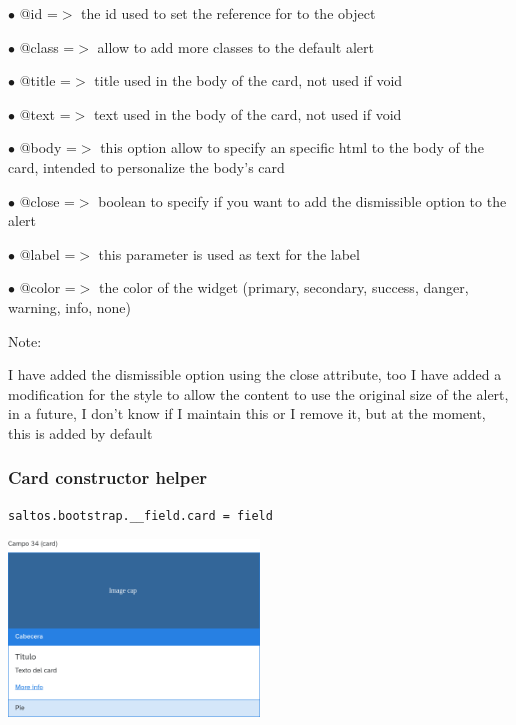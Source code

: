 \documentclass[a4paper]{article}
\begin{document}
\begin{compactitem}
\item[\color{myblue}$\bullet$] @id    =$>$ the id used to set the reference for to the object
\item[\color{myblue}$\bullet$] @class =$>$ allow to add more classes to the default alert
\item[\color{myblue}$\bullet$] @title =$>$ title used in the body of the card, not used if void
\item[\color{myblue}$\bullet$] @text  =$>$ text used in the body of the card, not used if void
\item[\color{myblue}$\bullet$] @body  =$>$ this option allow to specify an specific html to the body of the card, intended
          to personalize the body's card
\item[\color{myblue}$\bullet$] @close =$>$ boolean to specify if you want to add the dismissible option to the alert
\item[\color{myblue}$\bullet$] @label =$>$ this parameter is used as text for the label
\item[\color{myblue}$\bullet$] @color =$>$ the color of the widget (primary, secondary, success, danger, warning, info, none)
\end{compactitem}

Note:

I have added the dismissible option using the close attribute, too I have added a modification
for the style to allow the content to use the original size of the alert, in a future, I don't
know if I maintain this or I remove it, but at the moment, this is added by default

\hypertarget{toc77}{}
\subsubsection{Card constructor helper}

\begin{lstlisting}
saltos.bootstrap.__field.card = field
\end{lstlisting}

\begin{center}\includegraphics[width=0.5\textwidth]{../ujest/snaps/test-bootstrap-js-bootstrap-campo-34-card-1-snap.png}\end{center}
\end{document}
